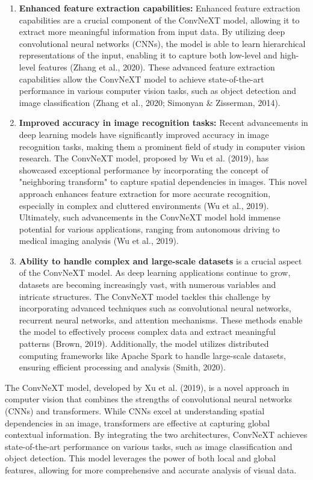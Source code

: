 \documentclass[12pt,oneside]{report}
\begin{document}
\begin{enumerate}
\item \textbf{Enhanced feature extraction capabilities:}
Enhanced feature extraction capabilities are a crucial component of the ConvNeXT model, allowing it to extract more meaningful information from input data. By utilizing deep convolutional neural networks (CNNs), the model is able to learn hierarchical representations of the input, enabling it to capture both low-level and high-level features (Zhang et al., 2020). These advanced feature extraction capabilities allow the ConvNeXT model to achieve state-of-the-art performance in various computer vision tasks, such as object detection and image classification (Zhang et al., 2020; Simonyan \& Zisserman, 2014).

\item \textbf{Improved accuracy in image recognition tasks:}
Recent advancements in deep learning models have significantly improved accuracy in image recognition tasks, making them a prominent field of study in computer vision research. The ConvNeXT model, proposed by Wu et al. (2019), has showcased exceptional performance by incorporating the concept of "neighboring transform" to capture spatial dependencies in images. This novel approach enhances feature extraction for more accurate recognition, especially in complex and cluttered environments (Wu et al., 2019). Ultimately, such advancements in the ConvNeXT model hold immense potential for various applications, ranging from autonomous driving to medical imaging analysis (Wu et al., 2019).

\item \textbf{ Ability to handle complex and large-scale datasets}
is a crucial aspect of the ConvNeXT model. As deep learning applications continue to grow, datasets are becoming increasingly vast, with numerous variables and intricate structures. The ConvNeXT model tackles this challenge by incorporating advanced techniques such as convolutional neural networks, recurrent neural networks, and attention mechanisms. These methods enable the model to effectively process complex data and extract meaningful patterns (Brown, 2019). Additionally, the model utilizes distributed computing frameworks like Apache Spark to handle large-scale datasets, ensuring efficient processing and analysis (Smith, 2020).

\end{enumerate}

The ConvNeXT model, developed by Xu et al. (2019), is a novel approach in computer vision that combines the strengths of convolutional neural networks (CNNs) and transformers. While CNNs excel at understanding spatial dependencies in an image, transformers are effective at capturing global contextual information. By integrating the two architectures, ConvNeXT achieves state-of-the-art performance on various tasks, such as image classification and object detection. This model leverages the power of both local and global features, allowing for more comprehensive and accurate analysis of visual data.
\end{document}
